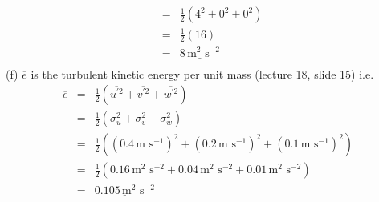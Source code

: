 \documentclass[11pt]{article}
\begin{document}
\begin{enumerate}
\begin{eqnarray*}
&=& \frac{1}{2}(4^2+0^2+0^2)\\
&=& \frac{1}{2}(16)\\
&=& \underline{8\, \textrm{m}^2\,\, \textrm{s}^{-2}}\\
\end{eqnarray*}
(f) $\overline{e}$ is the turbulent kinetic energy per unit mass (lecture 18, slide 15) i.e.
\begin{eqnarray*}
\overline{e} &=&  \frac{1}{2}(\overline{u^{\prime 2}}+\overline{v^{\prime 2}}+\overline{w^{\prime 2}})\\
&=& \frac{1}{2}(\sigma_u^2+\sigma_v^2+\sigma_w^2)\\
&=& \frac{1}{2}\left( (0.4 \,\textrm{m}\,\, \textrm{s}^{-1})^2 + (0.2 \,\textrm{m}\,\, \textrm{s}^{-1})^2 + (0.1 \,\textrm{m}\,\, \textrm{s}^{-1})^2 \right) \\
&=& \frac{1}{2}(0.16 \,\textrm{m}^2\,\, \textrm{s}^{-2} + 0.04 \,\textrm{m}^2\,\, \textrm{s}^{-2} + 0.01 \,\textrm{m}^2\,\, \textrm{s}^{-2}) \\
&=& \underline{0.105\, \textrm{m}^2\,\, \textrm{s}^{-2}}
\end{eqnarray*}

\end{enumerate}


\noindent
\end{document}
